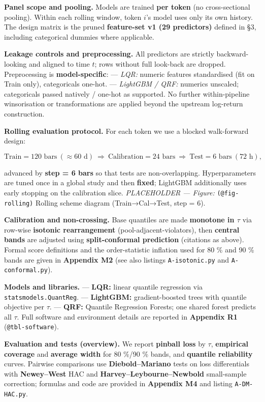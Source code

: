 \documentclass[
  a4paper,
  DIV=11,
  numbers=noendperiod]{scrreprt}
\begin{document}
\textbf{Panel scope and pooling.} Models are trained \textbf{per token}
(no cross-sectional pooling). Within each rolling window, token \(i\)'s
model uses only its own history. The design matrix is the pruned
\textbf{feature-set v1 (29 predictors)} defined in §3, including
categorical dummies where applicable.

\textbf{Leakage controls and preprocessing.} All predictors are strictly
backward-looking and aligned to time \(t\); rows without full look-back
are dropped. Preprocessing is \textbf{model-specific}: --- \emph{LQR:}
numeric features standardised (fit on Train only), categoricals one-hot.
--- \emph{LightGBM / QRF:} numerics unscaled; categoricals passed
natively / one-hot as supported. No further within-pipeline
winsorisation or transformations are applied beyond the upstream
log-return construction.

\textbf{Rolling evaluation protocol.} For each token we use a blocked
walk-forward design:

\[
\text{Train}=120\text{ bars}\ (\approx60\text{ d})\ \Rightarrow\
\text{Calibration}=24\text{ bars}\ \Rightarrow\
\text{Test}=6\text{ bars}\ (72\text{ h}),
\]

advanced by \textbf{step = 6 bars} so that tests are non-overlapping.
Hyperparameters are tuned once in a global study and then
\textbf{fixed}; LightGBM additionally uses early stopping on the
calibration slice. \emph{PLACEHOLDER --- Figure:}
\texttt{(@fig-rolling)} Rolling scheme diagram (Train→Cal→Test, step =
6).

\textbf{Calibration and non-crossing.} Base quantiles are made
\textbf{monotone in \(\tau\)} via row-wise \textbf{isotonic
rearrangement} (pool-adjacent-violators), then \textbf{central bands}
are adjusted using \textbf{split-conformal prediction} (citations as
above). Formal score definitions and the order-statistic inflation used
for 80 \% and 90 \% bands are given in \textbf{Appendix M2} (see also
listings \texttt{A-isotonic.py} and \texttt{A-conformal.py}).

\textbf{Models and libraries.} --- \textbf{LQR:} linear quantile
regression via \texttt{statsmodels.QuantReg}. --- \textbf{LightGBM:}
gradient-boosted trees with quantile objective per \(\tau\). ---
\textbf{QRF:} Quantile Regression Forests; one shared forest predicts
all \(\tau\). Full software and environment details are reported in
\textbf{Appendix R1} (\texttt{@tbl-software}).

\textbf{Evaluation and tests (overview).} We report \textbf{pinball
loss} by \(\tau\), \textbf{empirical coverage} and \textbf{average
width} for 80 \%/90 \% bands, and \textbf{quantile reliability} curves.
Pairwise comparisons use \textbf{Diebold--Mariano} tests on loss
differentials with \textbf{Newey--West} HAC and
\textbf{Harvey--Leybourne--Newbold} small-sample correction; formulas
and code are provided in \textbf{Appendix M4} and listing
\texttt{A-DM-HAC.py}.
\end{document}

